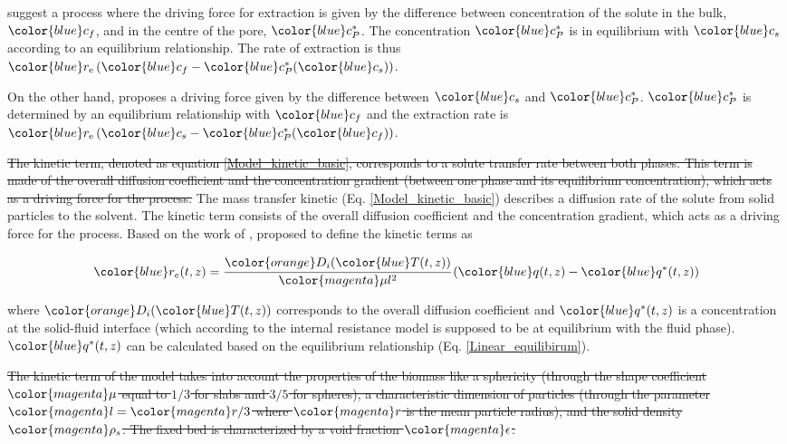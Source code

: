 \documentclass[a4paper,fleqn]{cas-dc}
\begin{document}
\citet{Bulley1984} suggest a process where the driving force for extraction is given by the difference between concentration of the solute in the bulk, ${\color{blue}c_f}$, and in the centre of the pore, ${\color{blue}c_P^*}$. The concentration ${\color{blue}c_P^*}$ is in equilibrium with ${\color{blue}c_s}$ according to an equilibrium relationship. The rate of extraction is thus ${\color{blue}r_\text{e}}\left({\color{blue}c_f} - {\color{blue}c^*_P}({\color{blue}c_s})\right)$. 

On the other hand, \citet{Reverchon1996} proposes a driving force given by the difference between ${\color{blue}c_s}$ and ${\color{blue}c_P^*}$. ${\color{blue}c_P^*}$ is determined by an equilibrium relationship with ${\color{blue}c_f}$ and the extraction rate is ${\color{blue}r_\text{e}}\left({\color{blue}c_s} - {\color{blue}c^*_P}({\color{blue}c_f})\right)$.

\sout{The kinetic term, denoted as equation \ref{Model_kinetic_basic}, corresponds to a solute transfer rate between both phases. This term is made of the overall diffusion coefficient and the concentration gradient (between one phase and its equilibrium concentration), which acts as a driving force for the process.} {\color{blue}The mass transfer kinetic (Eq. \ref{Model_kinetic_basic}) describes a diffusion rate of the solute from solid particles to the solvent. The kinetic term consists of the overall diffusion coefficient and the concentration gradient, which acts as a driving force for the process.} Based on the work of \citet{Bulley1984}, \citet{Reverchon1996} proposed to define the kinetic terms as

{\footnotesize
\begin{equation} \label{Model_kinetic_basic}
	{\color{blue}r_e}(t,z) = \cfrac{{\color{orange}D_i}({\color{blue}T}(t,z))}{{\color{magenta} \mu l^2} }\left({\color{blue}q}(t,z) - {\color{blue}q^*}(t,z) \right)
\end{equation} }

where ${\color{orange}D_i}({\color{blue}T}(t,z))$ corresponds to the overall diffusion coefficient and ${\color{blue}q^*}(t,z)$ is a concentration at the solid-fluid interface (which according to the internal resistance model is supposed to be at equilibrium with the fluid phase). ${\color{blue}q^*}(t,z)$ can be calculated based on the equilibrium relationship (Eq.  \ref{Linear_equilibirum}). 

\sout{The kinetic term of the model takes into account the properties of the biomass like a sphericity (through the shape coefficient ${\color{magenta}\mu}$ equal to $1/3$ for slabs and $3/5$ for spheres), a characteristic dimension of particles (through the parameter ${\color{magenta}l} = {\color{magenta}r}/3$ where ${\color{magenta}r}$ is the mean particle radius), and the solid density ${\color{magenta}\rho_s}$. The fixed bed is characterized by a void fraction ${\color{magenta}\epsilon}$. }
\end{document}
